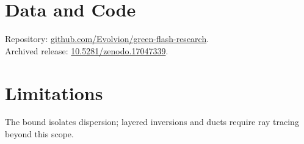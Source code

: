 \documentclass[10pt]{article}
\begin{document}
\section*{Data and Code}
Repository: \href{https://github.com/Evolvion/green-flash-research}{github.com/Evolvion/green-flash-research}.\\
Archived release: \href{https://doi.org/10.5281/zenodo.17047339}{10.5281/zenodo.17047339}.

\section{Limitations}
The bound isolates dispersion; layered inversions and ducts require ray tracing beyond this scope.



\end{document}
